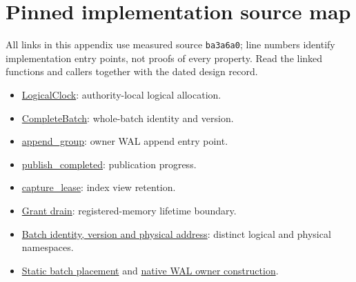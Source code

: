 \documentclass[11pt,a4paper]{article}
\begin{document}
\section{Pinned implementation source map}\label{app:source}
All links in this appendix use measured source \texttt{ba3a6a0}; line numbers identify implementation entry points, not proofs of every property. Read the linked functions and callers together with the dated design record.
\begin{itemize}
\item \href{https://github.com/Loris-EPFL/tidehunter-distributed/blob/ba3a6a0194cca6f171e5916649e7f4eeba65aeb0/tidehunter/src/distributed/sequence.rs\#L17-L21}{LogicalClock}: authority-local logical allocation.
\item \href{https://github.com/Loris-EPFL/tidehunter-distributed/blob/ba3a6a0194cca6f171e5916649e7f4eeba65aeb0/tidehunter/src/distributed/codec.rs\#L99-L103}{CompleteBatch}: whole-batch identity and version.
\item \href{https://github.com/Loris-EPFL/tidehunter-distributed/blob/ba3a6a0194cca6f171e5916649e7f4eeba65aeb0/tidehunter/src/distributed/storage.rs\#L947-L955}{append\_group}: owner WAL append entry point.
\item \href{https://github.com/Loris-EPFL/tidehunter-distributed/blob/ba3a6a0194cca6f171e5916649e7f4eeba65aeb0/tidehunter/src/distributed/remote_db.rs\#L2779}{publish\_completed}: publication progress.
\item \href{https://github.com/Loris-EPFL/tidehunter-distributed/blob/ba3a6a0194cca6f171e5916649e7f4eeba65aeb0/tidehunter/src/distributed/native_index/retention.rs\#L353-L356}{capture\_lease}: index view retention.
\item \href{https://github.com/Loris-EPFL/tidehunter-distributed/blob/ba3a6a0194cca6f171e5916649e7f4eeba65aeb0/tidehunter/src/distributed/tcp/reactor.rs\#L4139-L4143}{Grant drain}: registered-memory lifetime boundary.
\item \href{https://github.com/Loris-EPFL/tidehunter-distributed/blob/ba3a6a0194cca6f171e5916649e7f4eeba65aeb0/tidehunter/src/distributed/types.rs\#L10-L43}{Batch identity, version and physical address}: distinct logical and physical namespaces.
\item \href{https://github.com/Loris-EPFL/tidehunter-distributed/blob/ba3a6a0194cca6f171e5916649e7f4eeba65aeb0/tidehunter/src/distributed/storage.rs\#L68-L84}{Static batch placement} and \href{https://github.com/Loris-EPFL/tidehunter-distributed/blob/ba3a6a0194cca6f171e5916649e7f4eeba65aeb0/tidehunter/src/distributed/storage.rs\#L625-L636}{native WAL owner construction}.

\end{itemize}
\end{document}
